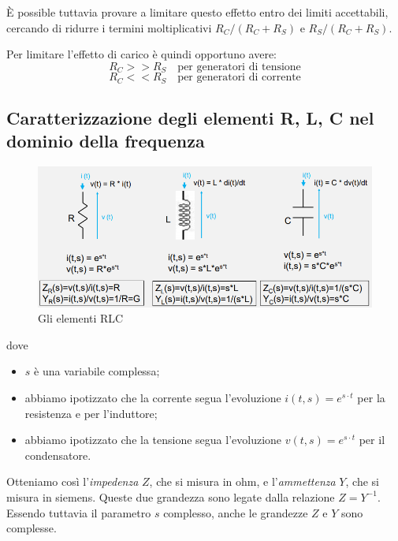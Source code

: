 \documentclass{article}
\begin{document}
È possible tuttavia provare a limitare questo effetto entro dei limiti accettabili, cercando di ridurre i termini moltiplicativi $R_C/(R_C + R_S)$ e $R_S/(R_C + R_S)$.

\vspace{1mm}

Per limitare l’effetto di carico è quindi opportuno avere:
\[R_C >> R_S \quad \textrm{per generatori di tensione}\]
\[R_C << R_S \quad \textrm{per generatori di corrente}\]










\subsection{Caratterizzazione degli elementi R, L, C nel dominio della frequenza}

\begin{figure}[h]
  \centering
  \includegraphics[scale=0.7]{IM_elementi_RLC_bis}
  \caption{Gli elementi RLC}
  \label{Schema_elementi_RLC}
\end{figure}

dove 
\begin{itemize}
  \item $s$ è una variabile complessa;
  \item abbiamo ipotizzato che la corrente segua l'evoluzione $i(t,s) = e^{s \cdot t}$ per la resistenza e per l'induttore;
  \item abbiamo ipotizzato che la tensione segua l'evoluzione $v(t,s) = e^{s \cdot t}$ per il condensatore.
\end{itemize}

Otteniamo così l'\textit{impedenza} $Z$, che si misura in ohm, e l'\textit{ammettenza} $Y$, che si misura in siemens. Queste due grandezza sono legate dalla relazione $Z=Y^{-1}$. Essendo tuttavia il parametro $s$ complesso, anche le grandezze $Z$ e $Y$ sono complesse.
\end{document}
